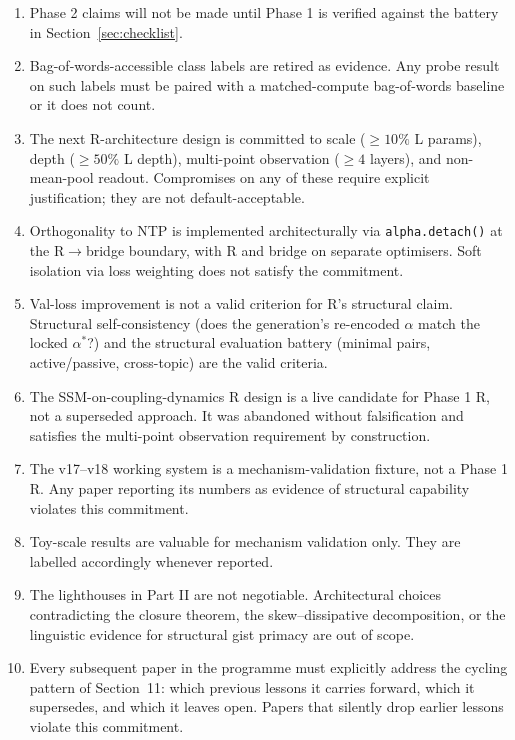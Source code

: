 \documentclass[10pt, twocolumn, a4paper]{article}
\begin{document}
\begin{enumerate}[nosep,leftmargin=*]
\item Phase 2 claims will not be made until Phase 1 is verified against the battery in Section~\ref{sec:checklist}.
\item Bag-of-words-accessible class labels are retired as evidence. Any probe result on such labels must be paired with a matched-compute bag-of-words baseline or it does not count.
\item The next R-architecture design is committed to scale ($\geq 10\%$ L params), depth ($\geq 50\%$ L depth), multi-point observation ($\geq 4$ layers), and non-mean-pool readout. Compromises on any of these require explicit justification; they are not default-acceptable.
\item Orthogonality to NTP is implemented architecturally via \texttt{alpha.detach()} at the R$\to$bridge boundary, with R and bridge on separate optimisers. Soft isolation via loss weighting does not satisfy the commitment.
\item Val-loss improvement is not a valid criterion for R's structural claim. Structural self-consistency (does the generation's re-encoded $\alpha$ match the locked $\alpha^*$?) and the structural evaluation battery (minimal pairs, active/passive, cross-topic) are the valid criteria.
\item The SSM-on-coupling-dynamics R design is a live candidate for Phase 1 R, not a superseded approach. It was abandoned without falsification and satisfies the multi-point observation requirement by construction.
\item The v17--v18 working system is a mechanism-validation fixture, not a Phase 1 R. Any paper reporting its numbers as evidence of structural capability violates this commitment.
\item Toy-scale results are valuable for mechanism validation only. They are labelled accordingly whenever reported.
\item The lighthouses in Part II are not negotiable. Architectural choices contradicting the closure theorem, the skew--dissipative decomposition, or the linguistic evidence for structural gist primacy are out of scope.
\item Every subsequent paper in the programme must explicitly address the cycling pattern of Section~11: which previous lessons it carries forward, which it supersedes, and which it leaves open. Papers that silently drop earlier lessons violate this commitment.
\end{enumerate}
\end{document}
